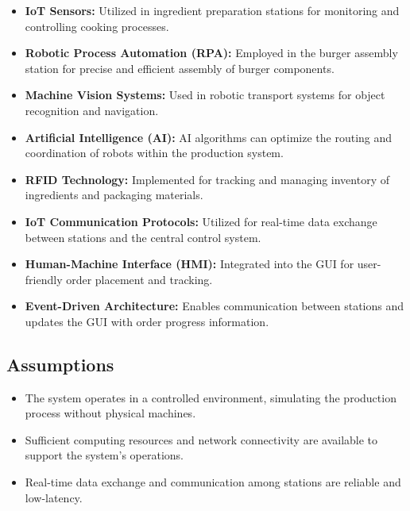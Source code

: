 \documentclass[conference]{IEEEtran}
\begin{document}
\begin{itemize}
    \item \textbf{IoT Sensors:} Utilized in ingredient preparation stations for monitoring and controlling cooking processes.
    
    \item \textbf{Robotic Process Automation (RPA):} Employed in the burger assembly station for precise and efficient assembly of burger components.
    
    \item \textbf{Machine Vision Systems:} Used in robotic transport systems for object recognition and navigation.
    
    \item \textbf{Artificial Intelligence (AI):} AI algorithms can optimize the routing and coordination of robots within the production system.
    
    \item \textbf{RFID Technology:} Implemented for tracking and managing inventory of ingredients and packaging materials.
    
    \item \textbf{IoT Communication Protocols:} Utilized for real-time data exchange between stations and the central control system.
    
    \item \textbf{Human-Machine Interface (HMI):} Integrated into the GUI for user-friendly order placement and tracking.
    
    \item \textbf{Event-Driven Architecture:} Enables communication between stations and updates the GUI with order progress information.
\end{itemize}

\subsection{Assumptions}

\begin{itemize}
    \item The system operates in a controlled environment, simulating the production process without physical machines.
    
    \item Sufficient computing resources and network connectivity are available to support the system's operations.
    
    \item Real-time data exchange and communication among stations are reliable and low-latency.
\end{itemize}
\end{document}
